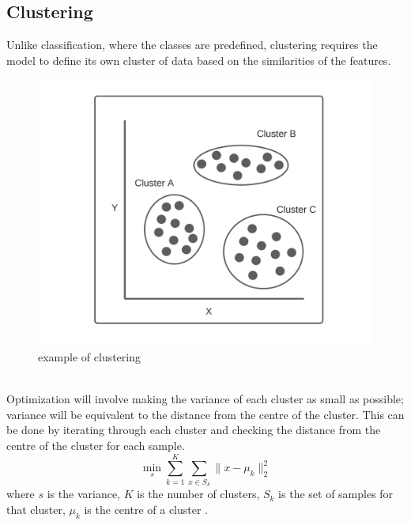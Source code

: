 \documentclass[10pt,a4paper]{report}
\begin{document}
				\subsection{Clustering}
					Unlike classification, where the classes are predefined, clustering requires the model to define its own cluster of data
					based on the similarities of the features.
					\begin{figure}[h]
						\centering
						\includegraphics[scale=0.7]{clustering-diagram.png}
						\caption{example of clustering}
						\label{fig:clustering}
					\end{figure} \\
					Optimization will involve making the variance of each cluster as small as possible; variance will
					be equivalent to the distance from the centre of the cluster. This can be done by iterating through each cluster
					and checking the distance from the centre of the cluster for each sample.
					\begin{equation}
						\min_s \sum_{k=1}^{K} \sum_{x\in S_k} \| x - \mu_k \|_{2}^{2}
						\label{eq:unsupervised-learning-clustering}
					\end{equation}
					where $s$ is the variance, $K$ is the number of clusters, $S_k$ is the set of samples for that cluster,
					$\mu_k$ is the centre of a cluster \autocite[p. 3-4]{SurveyOfOptimizationMethods}.
\end{document}
